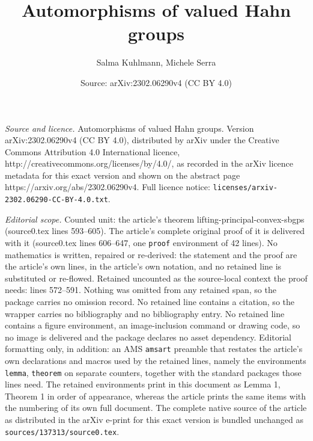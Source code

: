 \documentclass[10pt,a4paper]{amsart}
\title{Automorphisms of valued Hahn groups}
\author{Salma Kuhlmann, Michele Serra}
\date{Source: arXiv:2302.06290v4 (CC BY 4.0)}
\begin{document}
\maketitle

\noindent\emph{Source and licence.} Automorphisms of valued Hahn groups. Version arXiv:2302.06290v4 (CC BY 4.0), distributed by arXiv under the Creative Commons Attribution 4.0 International licence, http://creativecommons.org/licenses/by/4.0/, as recorded in the arXiv licence metadata for this exact version and shown on the abstract page https://arxiv.org/abs/2302.06290v4. Full licence notice: \texttt{licenses/arxiv-2302.06290-CC-BY-4.0.txt}.\par\smallskip

\noindent\textit{Editorial scope.} Counted unit: the article's theorem lifting-principal-convex-sbgps (source0.tex lines 593--605). The article's complete original proof of it is delivered with it (source0.tex lines 606--647, one \texttt{proof} environment of 42 lines). No mathematics is written, repaired or re-derived: the statement and the proof are the article's own lines, in the article's own notation, and no retained line is substituted or re-flowed.  Retained uncounted as the source-local context the proof needs: lines 572--591.  Nothing was omitted from any retained span, so the package carries no omission record.  No retained line contains a citation, so the wrapper carries no bibliography and no bibliography entry.  No retained line contains a figure environment, an image-inclusion command or drawing code, so no image is delivered and the package declares no asset dependency.  Editorial formatting only, in addition: an AMS \texttt{amsart} preamble that restates the article's own declarations and macros used by the retained lines, namely the environments \texttt{lemma}, \texttt{theorem} on separate counters, together with the standard packages those lines need.  The retained environments print in this document as Lemma 1, Theorem 1 in order of appearance, whereas the article prints the same items with the numbering of its own full document.  The complete native source of the article as distributed in the arXiv e-print for this exact version is bundled unchanged as \texttt{sources/137313/source0.tex}.
\end{document}

